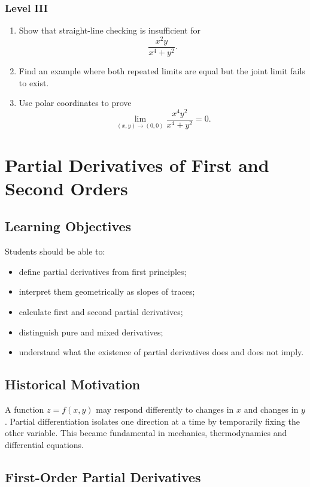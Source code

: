 \documentclass[11pt,oneside]{book}
\theoremstyle{studentthm}
\theoremstyle{definition}
\begin{document}
\subsection*{Level III}
\begin{enumerate}
\item Show that straight-line checking is insufficient for
\[
\frac{x^2y}{x^4+y^2}.
\]
\item Find an example where both repeated limits are equal but the
joint limit fails to exist.
\item Use polar coordinates to prove
\[
\lim_{(x,y)\to(0,0)}
\frac{x^4y^2}{x^4+y^2}=0.
\]
\end{enumerate}

\chapter{Partial Derivatives of First and Second Orders}

\section*{Learning Objectives}
Students should be able to:
\begin{itemize}
\item define partial derivatives from first principles;
\item interpret them geometrically as slopes of traces;
\item calculate first and second partial derivatives;
\item distinguish pure and mixed derivatives;
\item understand what the existence of partial derivatives does and
does not imply.
\end{itemize}

\section*{Historical Motivation}

A function \(z=f(x,y)\) may respond differently to changes in \(x\)
and changes in \(y\). Partial differentiation isolates one direction
at a time by temporarily fixing the other variable. This became
fundamental in mechanics, thermodynamics and differential equations.

\section{First-Order Partial Derivatives}
\end{document}
